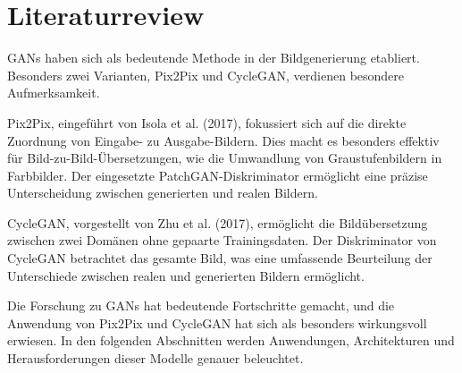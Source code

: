 \chapter{Literaturreview}
GANs haben sich als bedeutende Methode in der Bildgenerierung etabliert. Besonders zwei Varianten, Pix2Pix und CycleGAN, verdienen besondere Aufmerksamkeit.

Pix2Pix, eingeführt von Isola et al. (2017), fokussiert sich auf die direkte Zuordnung von Eingabe- zu Ausgabe-Bildern. Dies macht es besonders effektiv für Bild-zu-Bild-Übersetzungen, wie die Umwandlung von Graustufenbildern in Farbbilder. Der eingesetzte PatchGAN-Diskriminator ermöglicht eine präzise Unterscheidung zwischen generierten und realen Bildern.

CycleGAN, vorgestellt von Zhu et al. (2017), ermöglicht die Bildübersetzung zwischen zwei Domänen ohne gepaarte Trainingsdaten. Der Diskriminator von CycleGAN betrachtet das gesamte Bild, was eine umfassende Beurteilung der Unterschiede zwischen realen und generierten Bildern ermöglicht.

Die Forschung zu GANs hat bedeutende Fortschritte gemacht, und die Anwendung von Pix2Pix und CycleGAN hat sich als besonders wirkungsvoll erwiesen. In den folgenden Abschnitten werden Anwendungen, Architekturen und Herausforderungen dieser Modelle genauer beleuchtet.